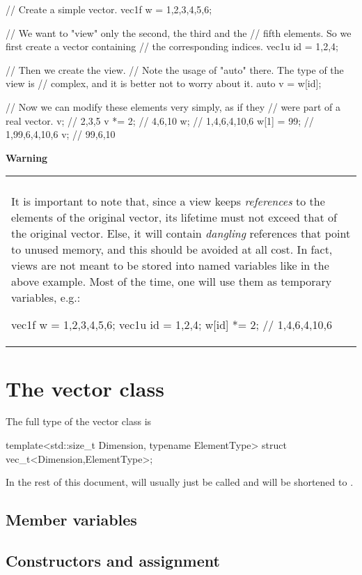 \documentclass[12pt]{report}
\newenvironment{warning}
{
    \vspace{0.3cm}\noindent \textbf{\color{blue} Warning} \\
    \noindent\begin{tabular}{p{0.95\textwidth}}
    \hline\\[-0.3cm]
}
{
    \\[0.2cm]\hline
    \end{tabular}
}
\begin{document}
\begin{cppcode}
// Create a simple vector.
vec1f w = {1,2,3,4,5,6};

// We want to "view" only the second, the third and the
// fifth elements. So we first create a vector containing
// the corresponding indices.
vec1u id = {1,2,4};

// Then we create the view.
// Note the usage of "auto" there. The type of the view is
// complex, and it is better not to worry about it.
auto v = w[id];

// Now we can modify these elements very simply, as if they
// were part of a real vector.
v;         // {2,3,5}
v *= 2;    // {4,6,10}
w;         // {1,4,6,4,10,6}
w[1] = 99; // {1,99,6,4,10,6}
v;         // {99,6,10}
\end{cppcode}

\begin{warning}
It is important to note that, since a view keeps \emph{references} to the elements of the original vector, its lifetime must not exceed that of the original vector. Else, it will contain \emph{dangling} references that point to unused memory, and this should be avoided at all cost. In fact, views are not meant to be stored into named variables like in the above example. Most of the time, one will use them as temporary variables, e.g.:
\begin{cppcode}
vec1f w = {1,2,3,4,5,6};
vec1u id = {1,2,4};
w[id] *= 2; // {1,4,6,4,10,6}
\end{cppcode}
\end{warning}

\section{The vector class \label{SEC:core:vec}}

The full type of the vector class is
\begin{cppcode}
template<std::size_t Dimension, typename ElementType>
struct vec_t<Dimension,ElementType>;
\end{cppcode}

In the rest of this document,  will usually just be called  and  will be shortened to .

\subsection{Member variables \label{SEC:core:vec:member_var}}
\subsection{Constructors and assignment \label{SEC:core:vec:constructor}}
\end{document}
